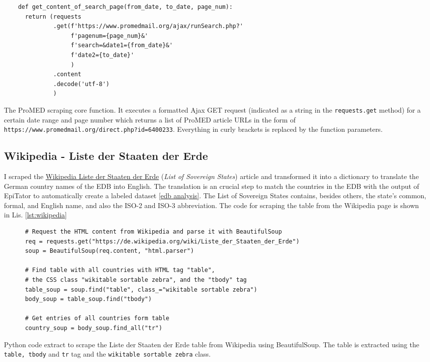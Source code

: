   \begin{listing}[h!]
    \begin{verbatim}
    def get_content_of_search_page(from_date, to_date, page_num):
      return (requests
              .get(f'https://www.promedmail.org/ajax/runSearch.php?'
                   f'pagenum={page_num}&'
                   f'search=&date1={from_date}&'
                   f'date2={to_date}'
                   )
              .content
              .decode('utf-8')
              )
    \end{verbatim}
    \caption{The ProMED scraping core function. It executes a formatted Ajax GET request (indicated as a string in the \texttt{requests.get} method) for a certain date range and page number which returns a list of ProMED article URLs in the form of \textquotesingle \texttt{https://www.promedmail.org/direct.php?id=6400233}\textquotesingle. Everything in curly brackets is replaced by the function parameters.}
    \label{lst:promed}
  \end{listing}

\subsection{Wikipedia - Liste der Staaten der Erde}\label{wikipedia}
  I scraped the \href{https://de.wikipedia.org/wiki/Liste_der_Staaten_der_Erde}{Wikipedia Liste der Staaten der Erde} (\textit{List of Sovereign States}) article and transformed it into a dictionary to translate the German country names of the EDB into English.
  The translation is an crucial step to match the countries in the EDB with the output of EpiTator to automatically create a labeled dataset \ref{edb analysis}.
  The List of Sovereign States contains, besides others, the state's common, formal, and English name, and also the ISO-2 and ISO-3 abbreviation.
  The code for scraping the table from the Wikipedia page is shown in Lis. \ref{lst:wikipedia}

  \begin{listing}[h]
    \begin{verbatim}
      # Request the HTML content from Wikipedia and parse it with BeautifulSoup
      req = requests.get("https://de.wikipedia.org/wiki/Liste_der_Staaten_der_Erde")
      soup = BeautifulSoup(req.content, "html.parser")

      # Find table with all countries with HTML tag "table",
      # the CSS class "wikitable sortable zebra", and the "tbody" tag
      table_soup = soup.find("table", class_="wikitable sortable zebra")
      body_soup = table_soup.find("tbody")

      # Get entries of all countries form table
      country_soup = body_soup.find_all("tr")
    \end{verbatim}
    \caption{Python code extract to scrape the Liste der Staaten der Erde table from Wikipedia using BeautifulSoup. The table is extracted using the \texttt{table, tbody} and \texttt{tr} tag and the \texttt{wikitable sortable zebra} class.}
    \label{lst:wikipedia}
  \end{listing}

